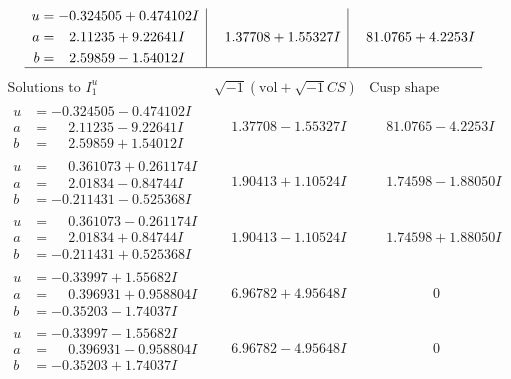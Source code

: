 \documentclass[1p]{elsarticle_modified}
\theoremstyle{definition}
\newcommand{\I}{\sqrt{-1}}
\begin{document}
$$\begin{array}{c|c|c}
\begin{aligned}
u &= -0.324505 + 0.474102 I \\
a &= \phantom{-}2.11235 + 9.22641 I \\
b &= \phantom{-}2.59859 - 1.54012 I\end{aligned}
 & \phantom{-}1.37708 + 1.55327 I & \phantom{-}81.0765 + 4.2253 I\\
 \hline 
 \end{array}$$\newpage$$\begin{array}{c|c|c}  
\text{Solutions to }I^u_{1}& \I (\text{vol} + \sqrt{-1}CS) & \text{Cusp shape}\\
 \hline 
\begin{aligned}
u &= -0.324505 - 0.474102 I \\
a &= \phantom{-}2.11235 - 9.22641 I \\
b &= \phantom{-}2.59859 + 1.54012 I\end{aligned}
 & \phantom{-}1.37708 - 1.55327 I & \phantom{-}81.0765 - 4.2253 I \\ \hline\begin{aligned}
u &= \phantom{-}0.361073 + 0.261174 I \\
a &= \phantom{-}2.01834 - 0.84744 I \\
b &= -0.211431 - 0.525368 I\end{aligned}
 & \phantom{-}1.90413 + 1.10524 I & \phantom{-}1.74598 - 1.88050 I \\ \hline\begin{aligned}
u &= \phantom{-}0.361073 - 0.261174 I \\
a &= \phantom{-}2.01834 + 0.84744 I \\
b &= -0.211431 + 0.525368 I\end{aligned}
 & \phantom{-}1.90413 - 1.10524 I & \phantom{-}1.74598 + 1.88050 I \\ \hline\begin{aligned}
u &= -0.33997 + 1.55682 I \\
a &= \phantom{-}0.396931 + 0.958804 I \\
b &= -0.35203 - 1.74037 I\end{aligned}
 & \phantom{-}6.96782 + 4.95648 I & \phantom{-0.000000 } 0 \\ \hline\begin{aligned}
u &= -0.33997 - 1.55682 I \\
a &= \phantom{-}0.396931 - 0.958804 I \\
b &= -0.35203 + 1.74037 I\end{aligned}
 & \phantom{-}6.96782 - 4.95648 I & \phantom{-0.000000 } 0 \\ \hline\begin{aligned}

\end{aligned}
\end{array}$$
\end{document}
